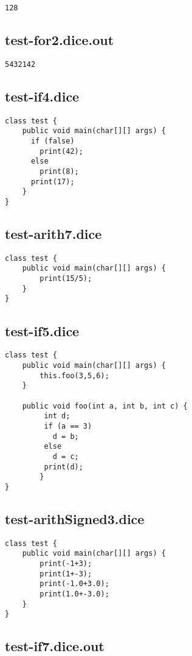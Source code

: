 \begin{verbatim}
128

\end{verbatim}\pagebreak\subsection{test-for2.dice.out}
\begin{verbatim}
5432142
\end{verbatim}\pagebreak\subsection{test-if4.dice}
\begin{verbatim}
class test {
	public void main(char[][] args) {
	  if (false) 
	  	print(42); 
	  else 
	  	print(8);
  	  print(17);
	}
}

\end{verbatim}\pagebreak\subsection{test-arith7.dice}
\begin{verbatim}
class test {
	public void main(char[][] args) {
		print(15/5);
	}
}

\end{verbatim}\pagebreak\subsection{test-if5.dice}
\begin{verbatim}
class test {
	public void main(char[][] args) {
		this.foo(3,5,6);
	}

	public void foo(int a, int b, int c) {
		 int d;
		 if (a == 3)
		   d = b;
		 else
		   d = c;
		 print(d);
		}
}

\end{verbatim}\pagebreak\subsection{test-arithSigned3.dice}
\begin{verbatim}
class test {
	public void main(char[][] args) {
		print(-1+3);
		print(1+-3);
		print(-1.0+3.0);
		print(1.0+-3.0);
	}
}
\end{verbatim}\pagebreak\subsection{test-if7.dice.out}
